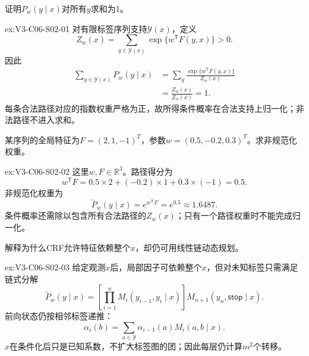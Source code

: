 \begin{SLChapterExercisePairSection}
\begin{exercise}\label{ex:V3-C06-S02-01}
证明$P_w(y\mid x)$对所有$y$求和为1。
\end{exercise}
\ifSLFullEdition
{}\label{sol:V3-C06-S02-01}
\begin{chapterexercisesolution}{ex:V3-C06-S02-01}
对有限标签序列支持$\mathcal Y(x)$，定义
\[
Z_w(x)=\sum_{y\in\mathcal Y(x)}\exp\{w^{\mathsf T}F(y,x)\}>0.
\]
因此
\[
\begin{aligned}
\sum_{y\in\mathcal Y(x)}P_w(y\mid x)
&=\sum_y\frac{\exp\{w^{\mathsf T}F(y,x)\}}{Z_w(x)}\\
&=\frac{Z_w(x)}{Z_w(x)}=1.
\end{aligned}
\]
每条合法路径对应的指数权重严格为正，故所得条件概率在合法支持上归一化；非法路径不进入求和。
\end{chapterexercisesolution}
\fi

\begin{exercise}\label{ex:V3-C06-S02-02}
某序列的全局特征为$F=(2,1,-1)^T$，参数$w=(0.5,-0.2,0.3)^T$。求非规范化权重。
\end{exercise}
\ifSLFullEdition
{}\label{sol:V3-C06-S02-02}
\begin{chapterexercisesolution}{ex:V3-C06-S02-02}
这里$w,F\in\mathbb R^3$。路径得分为
\[
w^{\mathsf T}F
=0.5\times2+(-0.2)\times1+0.3\times(-1)
=0.5.
\]
非规范化权重为
\[
\widetilde P_w(y\mid x)=e^{w^{\mathsf T}F}=e^{0.5}\approx1.6487.
\]
条件概率还需除以包含所有合法路径的$Z_w(x)$；只有一个路径权重时不能完成归一化。
\end{chapterexercisesolution}
\fi

\begin{exercise}\label{ex:V3-C06-S02-03}
解释为什么CRF允许特征依赖整个$x$，却仍可用线性链动态规划。
\end{exercise}
\ifSLFullEdition
{}\label{sol:V3-C06-S02-03}
\begin{chapterexercisesolution}{ex:V3-C06-S02-03}
给定观测$x$后，局部因子可依赖整个$x$，但对未知标签只需满足链式分解
\[
\widetilde P_w(y\mid x)
=\left[\prod_{i=1}^{n}M_i(y_{i-1},y_i\mid x)\right]
M_{n+1}(y_n,\mathsf{stop}\mid x).
\]
前向状态仍按相邻标签递推：
\[
\alpha_i(b)=\sum_{a\in\mathcal Y}\alpha_{i-1}(a)M_i(a,b\mid x).
\]
$x$在条件化后只是已知系数，不扩大标签图的团；因此每层仍计算$m^2$个转移。
\end{chapterexercisesolution}
\fi


\end{SLChapterExercisePairSection}
